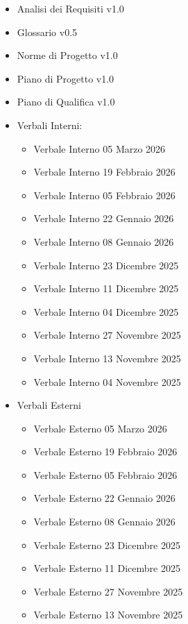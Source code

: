 \documentclass[a4paper,12pt]{article}
\begin{document}
\begin{itemize}
    \item Analisi dei Requisiti v1.0
    \item Glossario v0.5
    \item Norme di Progetto v1.0
    \item Piano di Progetto v1.0
    \item Piano di Qualifica v1.0
    \item Verbali Interni: 
    \begin{itemize}
        \item Verbale Interno 05 Marzo 2026
        \item Verbale Interno 19 Febbraio 2026
        \item Verbale Interno 05 Febbraio 2026
        \item Verbale Interno 22 Gennaio 2026
        \item Verbale Interno 08 Gennaio 2026
        \item Verbale Interno 23 Dicembre 2025
        \item Verbale Interno 11 Dicembre 2025
        \item Verbale Interno 04 Dicembre 2025
        \item Verbale Interno 27 Novembre 2025
        \item Verbale Interno 13 Novembre 2025
        \item Verbale Interno 04 Novembre 2025
    \end{itemize}
    \item Verbali Esterni
    \begin{itemize}
        \item Verbale Esterno 05 Marzo 2026
        \item Verbale Esterno 19 Febbraio 2026
        \item Verbale Esterno 05 Febbraio 2026
        \item Verbale Esterno 22 Gennaio 2026
        \item Verbale Esterno 08 Gennaio 2026
        \item Verbale Esterno 23 Dicembre 2025
        \item Verbale Esterno 11 Dicembre 2025
        \item Verbale Esterno 27 Novembre 2025
        \item Verbale Esterno 13 Novembre 2025
    \end{itemize}
\end{itemize}
\end{document}
